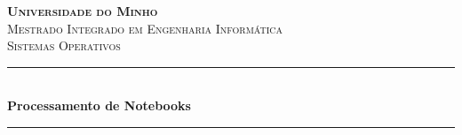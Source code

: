 \begin{titlepage}

\newcommand{\HRule}{\rule{\linewidth}{0.5mm}} %

\center %
 

\textbf{\textsc{\LARGE Universidade do Minho}}\\[1.5cm] %
\textsc{\Large Mestrado Integrado em Engenharia Informática}\\[0.5cm] %
\textsc{\large Sistemas Operativos}\\[0.8cm] %


\HRule \\[0.4cm]
{ \huge \bfseries Processamento de Notebooks}\\[0.4cm] %
\HRule \\[1.5cm]
 



\end{titlepage}
